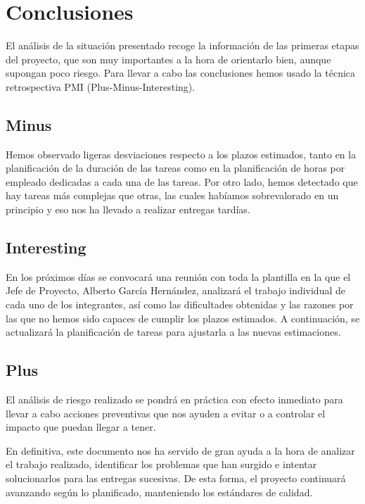 \section{Conclusiones}
\par El análisis de la situación presentado recoge la información de las primeras etapas del proyecto, que son muy importantes a la hora de orientarlo bien, aunque supongan poco riesgo. Para llevar a cabo las conclusiones hemos usado la técnica retrospectiva PMI (Plus-Minus-Interesting).
\subsection{Minus}
\par Hemos observado ligeras desviaciones respecto a los plazos estimados, tanto en la planificación de la duración de las tareas como en la planificación de horas por empleado dedicadas a cada una de las tareas. Por otro lado, hemos detectado que hay tareas más complejas que otras, las cuales habíamos sobrevalorado en un principio y eso nos ha llevado a realizar entregas tardías.
\subsection{Interesting}
\par En los próximos días se convocará una reunión con toda la plantilla en la que el Jefe de Proyecto, Alberto García Hernández, analizará el trabajo individual de cada uno de los integrantes, así como las dificultades obtenidas y las razones por las que no hemos sido capaces de cumplir los plazos estimados. A continuación, se actualizará la planificación de tareas para ajustarla a las nuevas estimaciones.
\subsection{Plus}
\par El análisis de riesgo realizado se pondrá en práctica con efecto inmediato para llevar a cabo acciones preventivas que nos ayuden a evitar o a controlar el impacto que puedan llegar a tener.
\bigbreak
\par En definitiva, este documento nos ha servido de gran ayuda a la hora de analizar el trabajo realizado, identificar los problemas que han surgido e intentar solucionarlos para las entregas sucesivas. De esta forma, el proyecto continuará avanzando según lo planificado, manteniendo los estándares de calidad.
